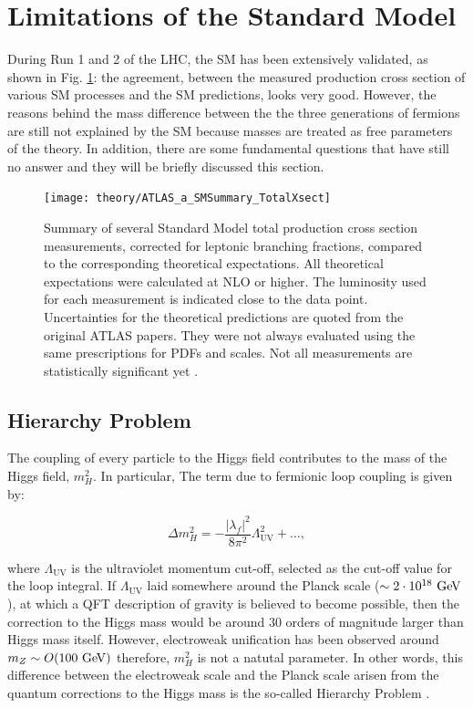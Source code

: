 	\section{Limitations of the Standard Model}
	\label{sec:SMlim}

		During Run 1 and 2 of the LHC, the SM has been extensively validated, as shown in Fig. \ref{fig:ATLAS_a_SMSummary_TotalXsect}: the agreement, between the measured production cross section of various SM processes and the SM predictions, looks very good. However, the reasons behind the mass difference between the the three generations of fermions are still not explained by the SM because masses are treated as free parameters of the theory. In addition, there are some fundamental questions that have still no answer and they will be briefly discussed this section.

		\begin{figure}[!htb]
			\centering
			\texttt{[image: theory/ATLAS\_a\_SMSummary\_TotalXsect]}
			\caption{\label{fig:ATLAS_a_SMSummary_TotalXsect} Summary of several Standard Model total production cross section measurements, corrected for leptonic branching fractions, compared to the corresponding theoretical expectations. All theoretical expectations were calculated at NLO or higher. The luminosity used for each measurement is indicated close to the data point. Uncertainties for the theoretical predictions are quoted from the original ATLAS papers. They were not always evaluated using the same prescriptions for PDFs and scales. Not all measurements are statistically significant yet \cite{ATLAS_a_SMSummary_TotalXsect}.}
		\end{figure}



		\subsection*{Hierarchy Problem}

			The coupling of every particle to the Higgs field contributes to the mass of the Higgs field, $m_H^2$. In particular, The term due to fermionic loop coupling is given by:

			\begin{equation}
			\label{eq:mH_fermionic_contribution}
			\Delta m_H^2 = - \frac{\left | \lambda_f \right |^2}{8 \pi ^2} \Lambda_{\mathrm{UV}}^2 + \dots ,
			\end{equation}

			\noindent where $\Lambda_{\mathrm{UV}}$ is the ultraviolet momentum cut-off, selected as the cut-off value for the loop integral. If $\Lambda_{\mathrm{UV}}$ laid somewhere around the Planck scale ($\sim 2 \cdot 10^{18} \gev$), at which a QFT description of gravity is believed to become possible, then the correction to the Higgs mass would be around 30 orders of magnitude larger than Higgs mass itself. However, electroweak unification has been observed around $m_Z \sim O(100\gev)$ therefore, $m_H^2$ is not a natutal parameter. In other words, this difference between the electroweak scale and the Planck scale arisen from the quantum corrections to the Higgs mass is the so-called Hierarchy Problem \cite{Weinberg1976}.



